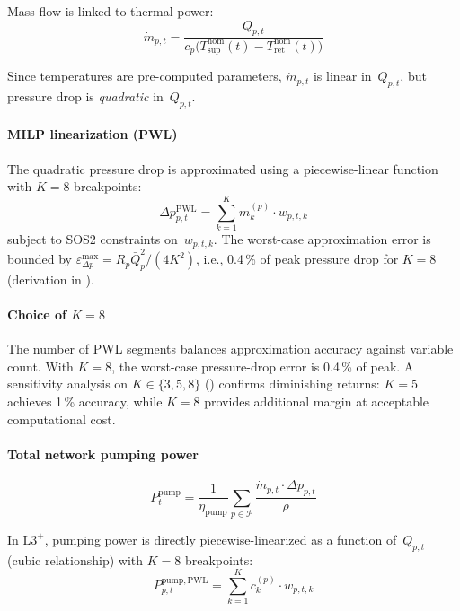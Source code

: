 \documentclass[review,3p]{elsarticle}
\newcommand{\Lplus}{\mathrm{L3}^{+}}
\begin{document}
Mass flow is linked to thermal power:
\begin{equation}
  \dot{m}_{p,t} = \frac{Q_{p,t}}{c_p \bigl(
    T_{\mathrm{sup}}^{\mathrm{nom}}(t)
    - T_{\mathrm{ret}}^{\mathrm{nom}}(t)\bigr)}
  \label{eq:massflow}
\end{equation}

Since temperatures are pre-computed parameters, $\dot{m}_{p,t}$ is
linear in~$Q_{p,t}$, but pressure drop is \emph{quadratic}
in~$Q_{p,t}$.

\paragraph{MILP linearization (PWL)}
The quadratic pressure drop is approximated using a piecewise-linear
function with $K=8$ breakpoints:
\begin{equation}
  \Delta p_{p,t}^{\mathrm{PWL}} = \sum_{k=1}^{K}
    m_k^{(p)} \cdot w_{p,t,k}
  \label{eq:pressure_pwl}
\end{equation}
subject to SOS2 constraints on~$w_{p,t,k}$. The worst-case
approximation error is bounded by
$\varepsilon_{\Delta p}^{\max} = R_p \bar{Q}_p^2 / (4K^2)$, i.e.,
0.4\,\% of peak pressure drop for $K=8$ (derivation in
).

\paragraph{Choice of $K=8$}
The number of PWL segments balances approximation accuracy against
variable count. With $K=8$, the worst-case pressure-drop error is
0.4\,\% of peak. A sensitivity analysis on $K \in \{3, 5, 8\}$
() confirms diminishing returns: $K=5$ achieves 1\,\%
accuracy, while $K=8$ provides additional margin at acceptable
computational cost.

\paragraph{Total network pumping power}
\begin{equation}
  P_t^{\mathrm{pump}} = \frac{1}{\eta_{\mathrm{pump}}}
    \sum_{p \in \mathcal{P}}
    \frac{\dot{m}_{p,t} \cdot \Delta p_{p,t}}{\rho}
  \label{eq:pump_power}
\end{equation}

In $\Lplus$, pumping power is directly piecewise-linearized as a
function of~$Q_{p,t}$ (cubic relationship) with $K=8$ breakpoints:
\begin{equation}
  P_{p,t}^{\mathrm{pump,PWL}} = \sum_{k=1}^{K}
    c_k^{(p)} \cdot w_{p,t,k}
  \label{eq:pump_pwl}
\end{equation}
\end{document}
